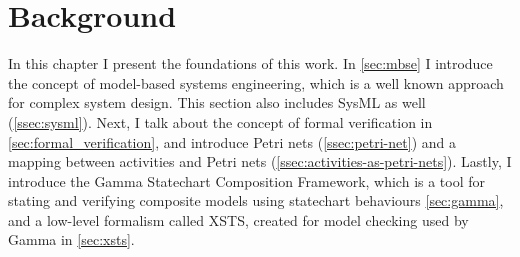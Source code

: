 \chapter{Background}\label{ch:background}

In this chapter I present the foundations of this work. In \autoref{sec:mbse} I introduce the concept of model-based systems engineering, which is a well known approach for complex system design. This section also includes SysML as well (\autoref{ssec:sysml}). Next, I talk about the concept of formal verification in \autoref{sec:formal_verification}, and introduce Petri nets (\autoref{ssec:petri-net}) and a mapping between activities and Petri nets (\autoref{ssec:activities-as-petri-nets}). Lastly, I introduce the Gamma Statechart Composition Framework, which is a tool for stating and verifying composite models using statechart behaviours \autoref{sec:gamma}, and a low-level formalism called XSTS, created for model checking used by Gamma in \autoref{sec:xsts}.


%




